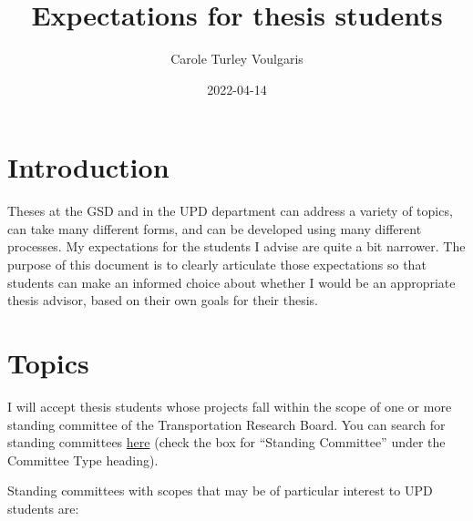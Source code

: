 \documentclass[
]{book}
\title{Expectations for thesis students}
\author{Carole Turley Voulgaris}
\date{2022-04-14}
\begin{document}
\maketitle

{
\setcounter{tocdepth}{1}
\tableofcontents
}
\hypertarget{introduction}{%
\chapter{Introduction}\label{introduction}}

Theses at the GSD and in the UPD department can address a variety of topics, can take many different forms, and can be developed using many different processes. My expectations for the students I advise are quite a bit narrower. The purpose of this document is to clearly articulate those expectations so that students can make an informed choice about whether I would be an appropriate thesis advisor, based on their own goals for their thesis.

\hypertarget{topics}{%
\chapter{Topics}\label{topics}}

I will accept thesis students whose projects fall within the scope of one or more standing committee of the Transportation Research Board. You can search for standing committees \href{https://www.mytrb.org/OnlineDirectory/Committee/}{here} (check the box for ``Standing Committee'' under the Committee Type heading).

Standing committees with scopes that may be of particular interest to UPD students are:
\end{document}
